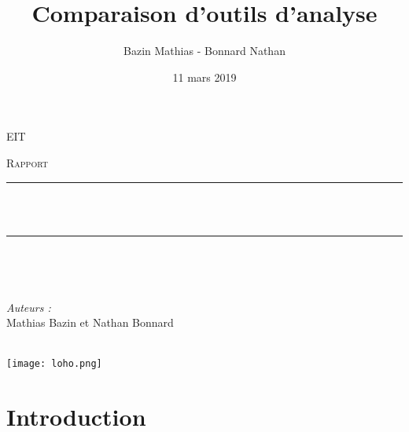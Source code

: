 \documentclass[12pt]{report}
\title{Comparaison d'outils d'analyse}
\author{ Bazin Mathias - Bonnard Nathan }
\date{11 mars 2019}
\makeatletter
\let\thetitle\@title
\makeatother
\begin{document}

\begin{titlepage}
	\centering
    \vspace*{0.5 cm}
\begin{center}    \textsc{\Large   EIT}\\[2.0 cm]	\end{center}
	\textsc{\Large Rapport  }\\[0.5 cm]				
	\rule{\linewidth}{0.2 mm} \\[0.4 cm]
	{ \huge \bfseries \thetitle}\\
	\rule{\linewidth}{0.2 mm} \\[1.5 cm]
	
	\begin{minipage}{0.4\textwidth}
		\begin{flushleft} \large
			\end{flushleft}
			\end{minipage}~
			\begin{minipage}{0.4\textwidth}
            
			\begin{flushright} \large
			\emph{Auteurs :} \\
			Mathias Bazin et Nathan Bonnard  
		\end{flushright}
           
	\end{minipage}\\[2 cm]
	
	\texttt{[image: loho.png]}
    
    
    
    
	
\end{titlepage}


\tableofcontents
\pagebreak

\renewcommand{\thesection}{\arabic{section}}
\section{Introduction}
\end{document}
